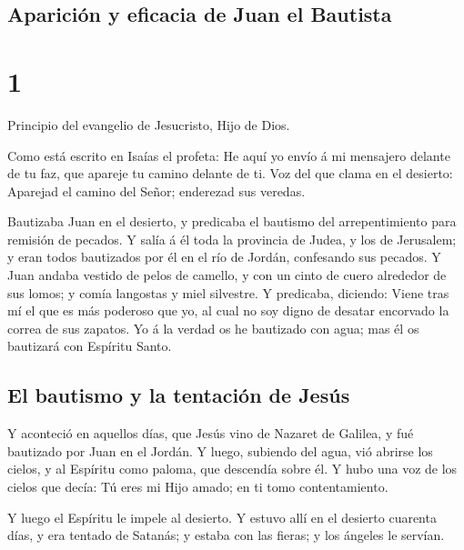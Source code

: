 \hypertarget{apariciuxf3n-y-eficacia-de-juan-el-bautista}{%
\subsection{Aparición y eficacia de Juan el
Bautista}\label{apariciuxf3n-y-eficacia-de-juan-el-bautista}}

\hypertarget{section}{%
\section{1}\label{section}}

 Principio del evangelio de Jesucristo, Hijo de Dios.

 Como está escrito en Isaías el profeta: He aquí yo envío
á mi mensajero delante de tu faz, que apareje tu camino delante de ti.
 Voz del que clama en el desierto: Aparejad el camino del
Señor; enderezad sus veredas.

 Bautizaba Juan en el desierto, y predicaba el bautismo
del arrepentimiento para remisión de pecados.  Y salía á
él toda la provincia de Judea, y los de Jerusalem; y eran todos
bautizados por él en el río de Jordán, confesando sus pecados.
 Y Juan andaba vestido de pelos de camello, y con un cinto
de cuero alrededor de sus lomos; y comía langostas y miel silvestre.
 Y predicaba, diciendo: Viene tras mí el que es más
poderoso que yo, al cual no soy digno de desatar encorvado la correa de
sus zapatos.  Yo á la verdad os he bautizado con agua; mas
él os bautizará con Espíritu Santo.

\hypertarget{el-bautismo-y-la-tentaciuxf3n-de-jesuxfas}{%
\subsection{El bautismo y la tentación de
Jesús}\label{el-bautismo-y-la-tentaciuxf3n-de-jesuxfas}}

 Y aconteció en aquellos días, que Jesús vino de Nazaret
de Galilea, y fué bautizado por Juan en el Jordán.  Y
luego, subiendo del agua, vió abrirse los cielos, y al Espíritu como
paloma, que descendía sobre él.  Y hubo una voz de los
cielos que decía: Tú eres mi Hijo amado; en ti tomo contentamiento.

 Y luego el Espíritu le impele al desierto.
 Y estuvo allí en el desierto cuarenta días, y era
tentado de Satanás; y estaba con las fieras; y los ángeles le servían.

